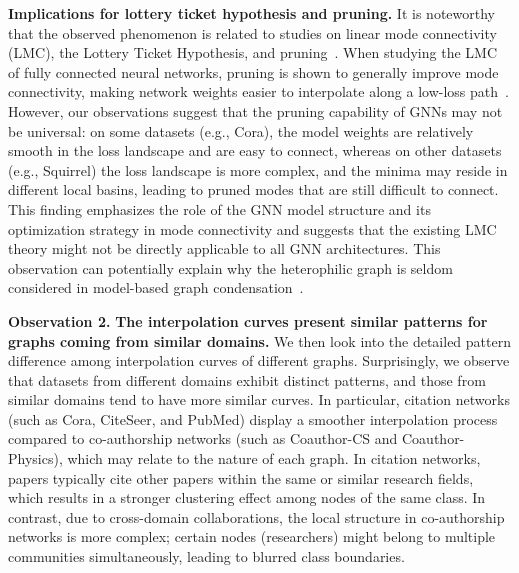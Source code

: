 \textbf{Implications for lottery ticket hypothesis and pruning.} It is noteworthy that the observed phenomenon is related to studies on linear mode connectivity (LMC), the Lottery Ticket Hypothesis, and pruning~\citep{frankle2020linear}. When studying the LMC of fully connected neural networks, pruning is shown to generally improve mode connectivity, making network weights easier to interpolate along a low-loss path~\citep{frankle2020linear}. However, our observations suggest that the pruning capability of GNNs may not be universal: on some datasets (e.g., Cora), the model weights are relatively smooth in the loss landscape and are easy to connect, whereas on other datasets (e.g., Squirrel) the loss landscape is more complex, and the minima may reside in different local basins, leading to pruned modes that are still difficult to connect. This finding emphasizes the role of the GNN model structure and its optimization strategy in mode connectivity and suggests that the existing LMC theory might not be directly applicable to all GNN architectures. This observation can potentially explain why the heterophilic graph is seldom considered in model-based graph condensation~\citep{jin2021graph, zheng2024structure}. 




\noindent\textbf{Observation 2.} \textbf{The interpolation curves present similar patterns for graphs coming from similar domains.} 
We then look into the detailed pattern difference among interpolation curves of different graphs. Surprisingly, we observe that datasets from different domains exhibit distinct patterns, and those from similar domains tend to have more similar curves. In particular, citation networks (such as Cora, CiteSeer, and PubMed) display a smoother interpolation process compared to co-authorship networks (such as Coauthor-CS and Coauthor-Physics), which may relate to the nature of each graph. In citation networks, papers typically cite other papers within the same or similar research fields, which results in a stronger clustering effect among nodes of the same class. In contrast, due to cross-domain collaborations, the local structure in co-authorship networks is more complex; certain nodes (researchers) might belong to multiple communities simultaneously, leading to blurred class boundaries. 


